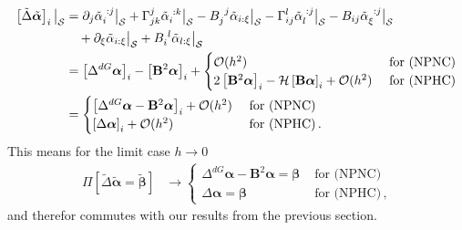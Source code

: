 \documentclass[a4paper,10pt]{scrartcl}
\newcommand{\surf}{\mathcal{S}}
\newcommand{\landau}{\mathcal{O}}
\newcommand{\Bb}{\mathbf{B}}
\newcommand{\alphab}{\bm{\alpha}}
\newcommand{\betab}{\bm{\beta}}
\newcommand{\talphab}{\tilde{\alphab}}
\newcommand{\talpha}{\tilde{\alpha}}
\newcommand{\tbetab}{\tilde{\betab}}
\newcommand{\tlaplace}{\tilde{\Delta}}
\newcommand{\ch}[2]{\Gamma_{#1}^{#2}}
\newcommand{\meanc}{\mathcal{H}}
\newcommand{\formComma}{\,\text{,}}
\newcommand{\formPeriod}{\,\text{.}}
\begin{document}
      \begin{align}
        \left[ \tlaplace\talphab \right]_{i}\big|_{\surf}
            &= \partial_{j} \tensor{\talpha}{_{i}^{:j}}\big|_{\surf} + \ch{jk}{j}\tensor{\talpha}{_{i}^{:k}}\big|_{\surf} 
                - \tensor{B}{_{j}^{j}}\talpha_{i:\xi}\big|_{\surf} - \ch{ij}{l} \tensor{\talpha}{_{l}^{:j}}\big|_{\surf}
                -B_{ij} \tensor{\talpha}{_{\xi}^{:j}}\big|_{\surf} \\
                &\quad+ \partial_{\xi}\talpha_{i:\xi}\big|_{\surf}
                +\tensor{B}{_{i}^{l}}\talpha_{l:\xi}\big|_{\surf}\\
            &= \left[ \Delta^{dG}\alphab \right]_{i} - \left[ \Bb^{2}\alphab \right]_{i} +
                \begin{cases}
                  \landau(h^{2}) & \text{ for (NPNC)} \\
                  2\left[ \Bb^{2}\alphab \right]_{i} - \meanc\left[ \Bb\alphab \right]_{i} +\landau(h^{2}) & \text{ for (NPHC)} 
                \end{cases} \\
            &=
              \begin{cases}
                \left[ \Delta^{dG}\alphab - \Bb^{2}\alphab\right]_{i} + \landau(h^{2}) & \text{ for (NPNC)} \\
                \left[ \Delta\alphab\right]_{i} + \landau(h^{2}) & \text{ for (NPHC)} \formPeriod
              \end{cases} 
      \end{align}
      This means for the limit case \( h \rightarrow 0 \)
      \begin{align}
        \Pi\left[\tlaplace\talphab = \tbetab  \right] &\longrightarrow 
            \begin{cases}
                \Delta^{dG}\alphab - \Bb^{2}\alphab = \betab & \text{ for (NPNC)} \\
                \Delta\alphab = \betab & \text{ for (NPHC)} \formComma
              \end{cases}
      \end{align}
      and therefor commutes with our results from the previous section.
\end{document}
